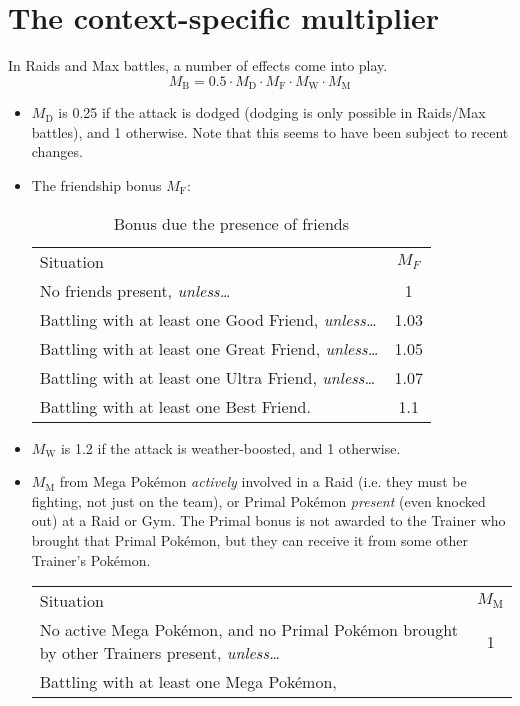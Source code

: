 \section{The context-specific multiplier\label{sec:mbmult}}
In Raids and Max battles, a number of effects come into play.
\[ M_\mathrm{B} = 0.5 \cdot M_\mathrm{D} \cdot M_\mathrm{F} \cdot M_\mathrm{W} \cdot M_\mathrm{M} \]
\begin{itemize}
 \item $M_\mathrm{D}$ is 0.25 if the attack is dodged (dodging is only possible in Raids/Max battles),
 and 1 otherwise. Note that this seems to have been subject to recent changes.
 \item The friendship bonus $M_\mathrm{F}$:
   \begin{table}[h!]
\centering
       \begin{tabular}{lc}
         Situation & $M_F$ \\
         \Midrule
         No friends present, \textit{unless…} & 1 \\
         Battling with at least one Good Friend, \textit{unless…} & 1.03 \\
         Battling with at least one Great Friend, \textit{unless…}  & 1.05 \\
         Battling with at least one Ultra Friend, \textit{unless…} & 1.07 \\
         Battling with at least one Best Friend. & 1.1
       \end{tabular}
     \caption{Bonus due the presence of friends}
   \end{table}
 \item $M_\mathrm{W}$ is 1.2 if the attack is weather-boosted, and 1 otherwise.
 \item $M_\mathrm{M}$ from Mega Pokémon \textit{actively} involved in a Raid (i.e. they
   must be fighting, not just on the team), or Primal Pokémon \textit{present}
   (even knocked out) at a Raid or Gym. The Primal bonus is not awarded to the Trainer who brought
   that Primal Pokémon, but they can receive it from some other Trainer's Pokémon.
   \begin{table}[h!]
     \centering
       \begin{tabular}{p{}c}
         Situation & $M_\mathrm{M}$ \\
         \Midrule
         No active Mega Pokémon, and no Primal Pokémon brought
          by other Trainers present, \textit{unless…} & 1 \\
         Battling with at least one Mega Pokémon,

\end{tabular}
\end{table}
\end{itemize}
